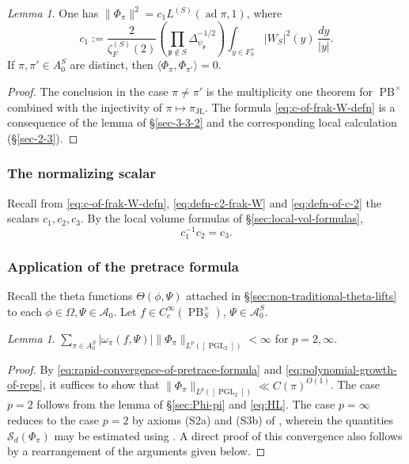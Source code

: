 \documentclass[reqno,10pt]{amsart}
\theoremstyle{plain} %
\theoremstyle{definition}
\theoremstyle{plain} %
\theoremstyle{remark}
\theoremstyle{itplain} %
\newtheorem{lemma}{Lemma}
\newtheorem*{lemma*}{Lemma}
\theoremstyle{remark} %
\numberwithin{equation}{section}
\DeclareMathOperator{\ad}{ad}
\DeclareMathOperator{\JL}{JL}
\def\PB{\operatorname{PB}}
\def\PGL{\operatorname{PGL}}
\begin{document}
\begin{lemma*}
  One has $\|\Phi_\pi\|^2 = c_1 L^{(S)}(\ad \pi,1)$, where
  \begin{equation}\label{eq:c-of-frak-W-defn}
    c_1
    :=
    \frac{2}{ \zeta_F^{(S)}(2)}
    \left(\prod_{\mathfrak{p} \notin S}
    \Delta_{\psi_{\mathfrak{p}}}^{-1/2}\right)
    \int_{y \in F_S^\times} |W_S|^2(y) \, \frac{d y}{|y|}.
  \end{equation}
  If $\pi, \pi ' \in A_0^S$ are distinct, then $\langle \Phi_{\pi}, \Phi_{\pi '} \rangle = 0$.
\end{lemma*}
\begin{proof}
  The conclusion in the case $\pi \neq \pi '$ is the multiplicity one theorem for $\PB^\times$ combined with the injectivity of $\pi \mapsto \pi_{\JL}$.  The formula \eqref{eq:c-of-frak-W-defn} is a consequence of the lemma of \S\ref{sec-3-3-2} and the corresponding local calculation (\S\ref{sec-2-3}).
\end{proof}




\subsubsection{The normalizing scalar}\label{sec:35ac3e5750}
Recall from \eqref{eq:c-of-frak-W-defn}, \eqref{eq:defn-c2-frak-W} and \eqref{eq:defn-of-c-2} the scalars $c_1,c_2,c_3$.  By the local volume formulas of \S\ref{sec:local-vol-formulas},
\begin{equation}\label{eqn:relation-c1-c2-c}
  c_1^{-1} c_2 = c_3.
\end{equation}

\subsubsection{Application of the pretrace formula}
\label{sec-4-5-2}
Recall the theta functions $\Theta(\phi,\Psi)$ attached in \S\ref{sec:non-traditional-theta-lifts} to each $\phi \in \Omega, \Psi \in \mathcal{A}_0$.
Let $f \in C_c^\infty(\PB^\times_S)$, $\Psi \in \mathcal{A}_0^S$.

\begin{lemma}\label{lem:abs-conv-of-silly-sum}
  $\sum_{\pi \in A_0^S} |\omega_\pi( f,\Psi)| \| \Phi_\pi \|_{L^p([\PGL_2])} < \infty$ for $p=2,\infty$.
\end{lemma}
\begin{proof}
  By \eqref{eq:rapid-convergence-of-pretrace-formula} and \eqref{eq:polynomial-growth-of-reps}, it suffices to show that $\| \Phi_\pi \|_{L^p([\PGL_2])} \ll C(\pi)^{O(1)}$.  The case $p=2$ follows from the lemma of \S\ref{sec:Phi-pi} and \eqref{eq:HL}.  The case $p=\infty$ reduces to the case $p=2$ by axioms (S2a) and (S3b) of \cite[\S2.4]{michel-2009}, wherein the quantities $\mathcal{S}_d(\Phi_\pi)$ may be estimated using \cite[\S3.2.5]{michel-2009}.  A direct proof of this convergence also follows by a rearrangement of the arguments given below.
\end{proof}
\end{document}
